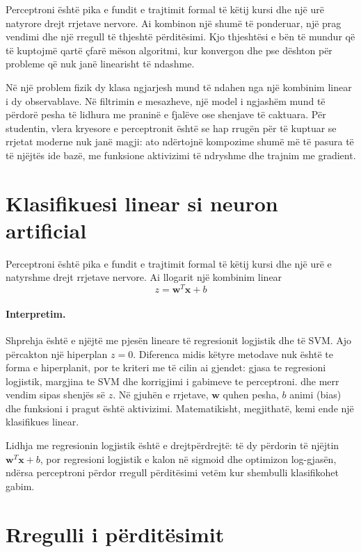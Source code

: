 \documentclass[12pt,a4paper,oneside]{book}
\begin{document}
Perceptroni është pika e fundit e trajtimit formal të këtij kursi dhe një urë natyrore drejt rrjetave nervore. Ai kombinon një shumë të ponderuar, një prag vendimi dhe një rregull të thjeshtë përditësimi. Kjo thjeshtësi e bën të mundur që të kuptojmë qartë çfarë mëson algoritmi, kur konvergon dhe pse dështon për probleme që nuk janë linearisht të ndashme.

Në një problem fizik dy klasa ngjarjesh mund të ndahen nga një kombinim linear i dy observablave. Në filtrimin e mesazheve, një model i ngjashëm mund të përdorë pesha të lidhura me praninë e fjalëve ose shenjave të caktuara. Për studentin, vlera kryesore e perceptronit është se hap rrugën për të kuptuar se rrjetat moderne nuk janë magji: ato ndërtojnë kompozime shumë më të pasura të të njëjtës ide bazë, me funksione aktivizimi të ndryshme dhe trajnim me gradient.
\section{Klasifikuesi linear si neuron artificial}

Perceptroni është pika e fundit e trajtimit formal të këtij kursi dhe një urë e natyrshme drejt rrjetave nervore. Ai llogarit një kombinim linear
\[
z=\mathbf w^T\mathbf x+b
\]

\paragraph{Interpretim.}
Shprehja është e njëjtë me pjesën lineare të regresionit logjistik dhe të SVM. Ajo përcakton një hiperplan $z=0$. Diferenca midis këtyre metodave nuk është te forma e hiperplanit, por te kriteri me të cilin ai gjendet: gjasa te regresioni logjistik, margjina te SVM dhe korrigjimi i gabimeve te perceptroni.
dhe merr vendim sipas shenjës së $z$. Në gjuhën e rrjetave, $\mathbf w$ quhen pesha, $b$ animi (bias) dhe funksioni i pragut është aktivizimi. Matematikisht, megjithatë, kemi ende një klasifikues linear.

Lidhja me regresionin logjistik është e drejtpërdrejtë: të dy përdorin të njëjtin $\mathbf w^T\mathbf x+b$, por regresioni logjistik e kalon në sigmoid dhe optimizon log-gjasën, ndërsa perceptroni përdor rregull përditësimi vetëm kur shembulli klasifikohet gabim.

\section{Rregulli i përditësimit}
\end{document}
